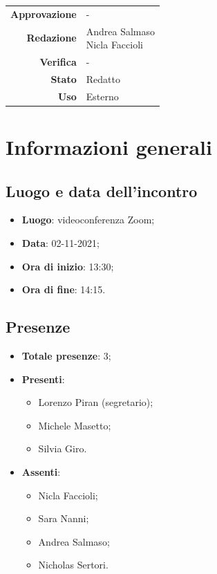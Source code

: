 \documentclass[11pt]{article}
\begin{document}
\begin{titlepage}
\begin{center}
			\large
			
			
			\vfill
			
			\begin{tabular}{r|l}
				\textbf{Approvazione} &  -\\
				\textbf{Redazione} &  \parbox[t]{3.5cm}{Andrea Salmaso \\Nicla Faccioli}\\
				\textbf{Verifica} &  -\\
				\textbf{Stato} & Redatto \\
				\textbf{Uso} & Esterno
			\end{tabular}
			\vfill
			
		\end{center}
	\end{titlepage}

	\newpage

	\section{Informazioni generali}
	\subsection{Luogo e data dell'incontro}
	\begin{itemize}
		\item \textbf{Luogo}: videoconferenza Zoom;
		\item \textbf{Data}: 02-11-2021;
		\item \textbf{Ora di inizio}: 13:30;
		\item \textbf{Ora di fine}: 14:15.
	\end{itemize}
	
	\subsection{Presenze}
	\begin{itemize}
		\item \textbf{Totale presenze}: 3;
		\item \textbf{Presenti}:
		\begin{itemize}
			\item Lorenzo Piran (segretario);
			\item Michele Masetto;
			\item Silvia Giro.
		\end{itemize}
		\item \textbf{Assenti}:
		\begin{itemize}
			\item Nicla Faccioli;
			\item Sara Nanni;
			\item Andrea Salmaso;
			\item Nicholas Sertori.
		\end{itemize}
	\end{itemize}
\end{document}
